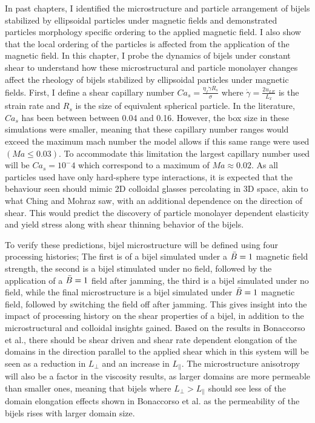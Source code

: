 In past chapters, I identified the microstructure and particle arrangement of bijels stabilized by ellipsoidal particles under magnetic fields and demonstrated
particles morphology specific ordering to the applied magnetic field. I also show that the local ordering of the particles is affected from the application of
the magnetic field. In this chapter, I probe the dynamics of bijels under constant shear to understand how these microstructural and particle monolayer changes
affect the rheology of bijels stabilized by ellipsoidal particles under magnetic fields. First, I define a shear capillary number 
$Ca_s = \frac{\eta_{f} \dot{\gamma} R_s}{\sigma}$ where $\dot{\gamma} = \frac{2u_{LE}}{L_x}$ is the
strain rate and $R_s$ is the size of equivalent spherical particle. \cite{frijters_effects_2012, yang_capillary_2022} In the literature, $Ca_s$ has been between between 0.04 
and 0.16. However, the box size in these simulations were smaller, meaning that these capillary number ranges would exceed the 
maximum mach number the model allows if this same range were used $(Ma \leq 0.03)$. To accommodate this limitation the 
largest capillary number used will be $Ca_s = 10^-4$ which correspond to a maximum of $Ma \approx 0.02$. As all particles used 
have only hard-sphere type interactions, it is expected that the behaviour seen should mimic 2D colloidal glasses 
percolating in 3D space, akin to what Ching and Mohraz saw, with an additional dependence on the direction of shear. 
This would predict the discovery of particle monolayer dependent elasticity and yield stress along with shear thinning 
behavior of the bijels.

To verify these predictions, bijel microstructure will be defined using four processing histories; The first is of a 
bijel simulated under a $\Bar{B} = 1$ magnetic field strength, the second is a bijel stimulated under no field, 
followed by the application of a $\Bar{B} = 1$ field after jamming, the third is a bijel simulated under no field, 
while the final microstructure is a bijel simulated under $\Bar{B} = 1$ magnetic field, followed by switching the 
field off after jamming. This gives insight into the impact of processing history on the shear properties of a bijel, 
in addition to the microstructural and colloidal insights gained. Based on the results in Bonaccorso et al., there 
should be shear driven and shear rate dependent elongation of the domains in the direction parallel to the applied 
shear which in this system will be seen as a reduction in $L_{\perp}$ and an increase in $L_{\parallel}$. 
\cite{bonaccorso_shear_2020} The microstructure anisotropy will also be a factor in the viscosity results, as 
larger domains are more permeable than smaller ones, meaning that bijels where $L_{\perp} > L_{\parallel}$ should 
see less of the domain elongation effects shown in Bonaccorso et al. as the permeability of the bijels rises with 
larger domain size. \cite{bonaccorso_shear_2020}

